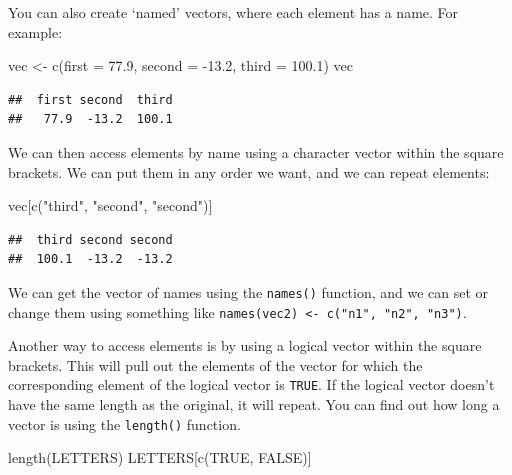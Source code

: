 \documentclass[
  oneside]{book}
\newenvironment{Shaded}{\begin{snugshade}}{\end{snugshade}}
\newcommand{\AttributeTok}[1]{\textcolor[rgb]{0.77,0.63,0.00}{#1}}
\newcommand{\ConstantTok}[1]{\textcolor[rgb]{0.00,0.00,0.00}{#1}}
\newcommand{\FloatTok}[1]{\textcolor[rgb]{0.00,0.00,0.81}{#1}}
\newcommand{\FunctionTok}[1]{\textcolor[rgb]{0.00,0.00,0.00}{#1}}
\newcommand{\NormalTok}[1]{#1}
\newcommand{\OtherTok}[1]{\textcolor[rgb]{0.56,0.35,0.01}{#1}}
\newcommand{\SpecialCharTok}[1]{\textcolor[rgb]{0.00,0.00,0.00}{#1}}
\newcommand{\StringTok}[1]{\textcolor[rgb]{0.31,0.60,0.02}{#1}}
\begin{document}
You can also create `named' vectors, where each element has a name. For example:

\begin{Shaded}
\begin{Highlighting}[]
\NormalTok{vec }\OtherTok{\textless{}{-}} \FunctionTok{c}\NormalTok{(}\AttributeTok{first =} \FloatTok{77.9}\NormalTok{, }\AttributeTok{second =} \SpecialCharTok{{-}}\FloatTok{13.2}\NormalTok{, }\AttributeTok{third =} \FloatTok{100.1}\NormalTok{)}
\NormalTok{vec}
\end{Highlighting}
\end{Shaded}

\begin{verbatim}
##  first second  third 
##   77.9  -13.2  100.1
\end{verbatim}

We can then access elements by name using a character vector within the square brackets. We can put them in any order we want, and we can repeat elements:

\begin{Shaded}
\begin{Highlighting}[]
\NormalTok{vec[}\FunctionTok{c}\NormalTok{(}\StringTok{"third"}\NormalTok{, }\StringTok{"second"}\NormalTok{, }\StringTok{"second"}\NormalTok{)]}
\end{Highlighting}
\end{Shaded}

\begin{verbatim}
##  third second second 
##  100.1  -13.2  -13.2
\end{verbatim}

\begin{info}
We can get the vector of names using the \texttt{names()} function, and we can set or change them using something like \texttt{names(vec2)\ \textless{}-\ c("n1",\ "n2",\ "n3")}.

\end{info}

Another way to access elements is by using a logical vector within the square brackets. This will pull out the elements of the vector for which the corresponding element of the logical vector is \texttt{TRUE}. If the logical vector doesn't have the same length as the original, it will repeat. You can find out how long a vector is using the \texttt{length()} function.

\begin{Shaded}
\begin{Highlighting}[]
\FunctionTok{length}\NormalTok{(LETTERS)}
\NormalTok{LETTERS[}\FunctionTok{c}\NormalTok{(}\ConstantTok{TRUE}\NormalTok{, }\ConstantTok{FALSE}\NormalTok{)]}
\end{Highlighting}
\end{Shaded}
\end{document}
